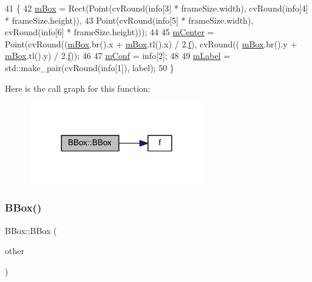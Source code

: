 \begin{DoxyCode}
41     \{
42         \mbox{\hyperlink{class_b_box_ac9143a10a051ff8ce0ae26e6c1e4b4e1}{mBox}} = Rect(Point(cvRound(info[3] * frameSize.width), cvRound(info[4] * frameSize.height)),
43             Point(cvRound(info[5] * frameSize.width), cvRound(info[6] * frameSize.height)));
44 
45         \mbox{\hyperlink{class_b_box_a4367a9314599320633ef19abfae3a83c}{mCenter}} = Point(cvRound((\mbox{\hyperlink{class_b_box_ac9143a10a051ff8ce0ae26e6c1e4b4e1}{mBox}}.br().x + \mbox{\hyperlink{class_b_box_ac9143a10a051ff8ce0ae26e6c1e4b4e1}{mBox}}.tl().x) / 2.\mbox{\hyperlink{rings_8cpp_a77369fc4d5326a16d2c603e032023528}{f}}), cvRound((
      \mbox{\hyperlink{class_b_box_ac9143a10a051ff8ce0ae26e6c1e4b4e1}{mBox}}.br().y + \mbox{\hyperlink{class_b_box_ac9143a10a051ff8ce0ae26e6c1e4b4e1}{mBox}}.tl().y) / 2.\mbox{\hyperlink{rings_8cpp_a77369fc4d5326a16d2c603e032023528}{f}}));
46 
47         \mbox{\hyperlink{class_b_box_ac2b9483e6f0372284e06724d7ae953ff}{mConf}} = info[2];
48 
49         \mbox{\hyperlink{class_b_box_a779985e94cd7b9b3c62208493de419be}{mLabel}} = std::make\_pair(cvRound(info[1]), label);
50     \}
\end{DoxyCode}
Here is the call graph for this function\+:\nopagebreak
\begin{figure}[H]
\begin{center}
\leavevmode
\includegraphics[width=216pt]{class_b_box_abf992411e47d4e0724b658c7d5b859f5_cgraph}
\end{center}
\end{figure}
\mbox{\label{class_b_box_a688936f49a66994f465852fb80373766}} 
\subsubsection{\texorpdfstring{B\+Box()}{BBox()}\hspace{0.1cm}{\footnotesize\ttfamily [3/4]}}
{\footnotesize\ttfamily B\+Box\+::\+B\+Box (\begin{DoxyParamCaption}\item[{const \mbox{\hyperlink{class_b_box}{B\+Box}} \&}]{other }\end{DoxyParamCaption})\hspace{0.3cm}{\ttfamily [inline]}}



